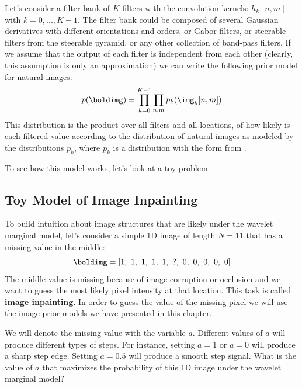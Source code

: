 Let's consider a filter bank of $K$ filters with the convolution kernels: $h_k [n,m]$ with $k=0, ..., K-1$. The filter bank could be composed of several Gaussian derivatives with different orientations and orders, or Gabor filters, or steerable filters from the steerable pyramid, or any other collection of band-pass filters. If we assume that the output of each filter is independent from each other (clearly, this assumption is only an approximation) we can write the following prior model for natural images:
\begin{equation}
p(\boldimg) = \prod_{k=0}^{K-1} \prod_{n,m} p_k(\img_k [n,m])
\label{eq:waveletmodel}
\end{equation}
This distribution is the product over all filters and all locations, of how likely is each filtered value according to the distribution of natural images as modeled by the distributions $p_k$, where $p_k$ is a distribution with the form from \eqn{\ref{eq:derdist}}. 



To see how this model works, let's look at a toy problem. 

\subsection{Toy Model of Image Inpainting}


To build intuition about image structures that are likely under the wavelet marginal model, let's consider a simple 1D image of length $N=11$ that has a missing value in the middle:
\begin{equation}
\boldimg = \left[1,~ 1,~ 1,~ 1,~ 1,~ ?,~ 0,~ 0,~ 0,~ 0,~ 0\right]
\end{equation}
The middle value is missing because of image corruption or occlusion and we want to guess the most likely pixel intensity at that location. This task is called {\bf image inpainting}. In order to guess the value of the missing pixel we will use the image prior models we have presented in this chapter. 

We will denote the missing value with the variable $a$. Different values of $a$ will produce different types of steps. For instance, setting $a=1$ or $a=0$ will produce a sharp step edge. Setting $a=0.5$ will produce a smooth step signal. What is the value of $a$ that maximizes the probability of this 1D image under the wavelet marginal model? 

